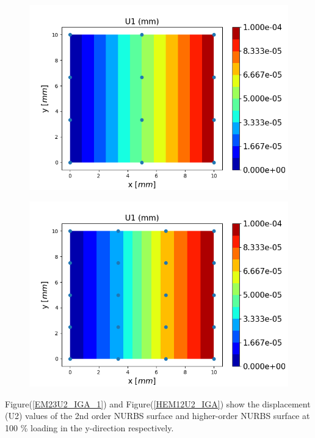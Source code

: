 \documentclass[12pt]{article}
\begin{document}
\begin{figure}[H]
	\centering
	\begin{minipage}{.5\textwidth}
		\centering
		\includegraphics[width=1\linewidth]{EM23U1_IGA.png}
		\label{EM23U1_IGA_1}
	\end{minipage}%
	\begin{minipage}{.5\textwidth}
		\centering
		\includegraphics[width=1\linewidth]{HEM12U1_IGA.png}
		\label{HEM12U1_IGA}
	\end{minipage}
\end{figure}
\noindent
Figure(\ref{EM23U2_IGA_1}) and Figure(\ref{HEM12U2_IGA}) show the displacement (U2) values of the 2nd order NURBS surface and higher-order NURBS surface at 100 \% loading in the y-direction respectively. \\
\end{document}
